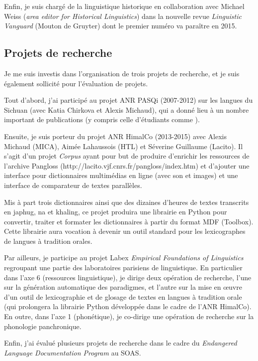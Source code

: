 \documentclass[oldfontcommands,oneside,a4paper,11pt]{article}
\begin{document}
Enfin, je suis chargé de la linguistique historique en collaboration avec Michael Weiss (\textit{area editor for Historical Linguistics}) dans la nouvelle revue \textit{Linguistic Vanguard} (Mouton de Gruyter) dont le premier numéro va paraître en 2015.


\subsection{Projets de recherche} \label{sec:projets}
Je me suis investis dans l'organisation de trois projets de recherche, et je suis également sollicité pour l'évaluation de projets.

Tout d'abord, j'ai participé au projet ANR PASQi (2007-2012) sur les langues du Sichuan (avec Katia Chirkova et Alexis Michaud), qui a donné lieu à un nombre important de publications (y compris celle d'étudiants comme \citealt{gongxun14agreement}).

Ensuite, je suis porteur du projet ANR HimalCo (2013-2015) avec Alexis Michaud (MICA), Aimée Lahaussois (HTL) et Séverine Guillaume (Lacito). Il s'agit d'un projet \textit{Corpus} ayant pour but de produire d'enrichir les ressources de l'archive Pangloss (http://lacito.vjf.cnrs.fr/pangloss/index.htm) et d'ajouter une interface pour dictionnaires multimédias en ligne (avec son et images) et une interface de comparateur de textes parallèles.

Mis à part trois dictionnaires ainsi que des dizaines d'heures de textes transcrits en japhug, na et khaling, ce projet produira une librairie en Python pour convertir, traiter et formater les dictionnaires à partir du format MDF (Toolbox). Cette librairie aura vocation à devenir un outil standard pour les lexicographes de langues à tradition orales.

Par ailleurs, je participe au projet Labex \textit{Empirical Foundations of Linguistics} regroupant une partie des laboratoires parisiens de linguistique. En particulier dans l'axe 6 (ressources linguistique),  je dirige deux opération de recherche, l'une sur la génération automatique des paradigmes, et l'autre sur la mise en œuvre d'un outil de lexicographie et de glosage de textes en langues à tradition orale (qui prolongera la librairie Python développée dans le cadre de l'ANR HimalCo).  En outre, dans l'axe 1 (phonétique),  je co-dirige une opération de recherche sur la phonologie panchronique.


Enfin, j'ai évalué  plusieurs projets de recherche dans le cadre du \textit{Endangered Language Documentation Program} au SOAS.



 
\end{document}
